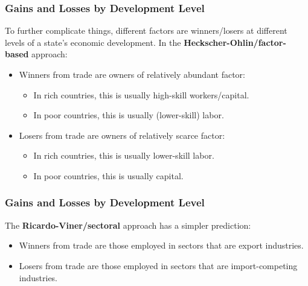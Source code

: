 \documentclass[handout]{beamer}
\begin{document}
\begin{frame} 
	\frametitle{\LARGE Gains and Losses by Development Level}
To further complicate things, different factors are winners/losers at different levels of a state's economic development. In the \textbf{Heckscher-Ohlin/factor-based} approach:
	\begin{itemize}
		\item Winners from trade are owners of relatively abundant factor: \pause 
		\begin{itemize}
			\item In rich countries, this is usually high-skill workers/capital.
			\item In poor countries, this is usually (lower-skill) labor. \pause
		\end{itemize}
		\item Losers from trade are owners of relatively scarce factor: \pause 
		\begin{itemize}
			\item In rich countries, this is usually lower-skill labor.
			\item In poor countries, this is usually capital. 
		\end{itemize} 
	\end{itemize}
\end{frame}

\begin{frame} 
	\frametitle{\LARGE Gains and Losses by Development Level}
	The \textbf{Ricardo-Viner/sectoral} approach has a simpler prediction:
	\begin{itemize}
		\item Winners from trade are those employed in sectors that are export industries. \pause 
		\item Losers from trade are those employed in sectors that are import-competing industries.
	\end{itemize}
\end{frame}
\end{document}

